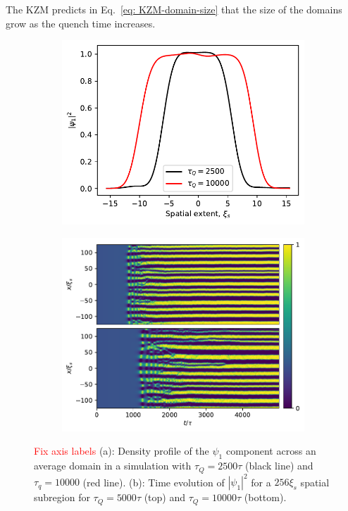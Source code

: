 The KZM predicts in Eq.~\eqref{eq: KZM-domain-size} that the size of the domains
grow as the quench time increases.
\begin{figure}[tb]
    \centering
    \begin{subfigure}{0.45\textwidth}
        \includegraphics[width=\textwidth]{gfx/ch-spin1/BA-FM_domain_width.pdf}
        \caption{\label{fig: BA-FM-domain-width-comparison}}
    \end{subfigure}
    \begin{subfigure}{0.45\textwidth}
        \includegraphics[width=\textwidth]{gfx/ch-spin1/BA-FM_domain_onset.pdf}
        \caption{\label{fig: BA-FM-domain-onset}}
    \end{subfigure}
    \caption[Density profile across an average FM domain]
    {\textcolor{red}{Fix axis labels}
    (a): Density profile of the \(\psi_1\) component across an average
        domain in a simulation with \(\tau_Q=2500\tau \) (black line) and
        \(\tau_q=10000\) (red line).
        (b): Time evolution of \( |\psi_1|^2\) for a \(256\xi_s\) spatial subregion
        for \( \tau_Q=5000\tau \) (top) and \(\tau_Q=10000\tau \) (bottom).}
\end{figure}
